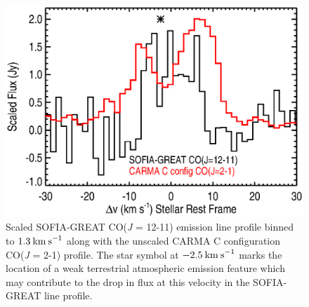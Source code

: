 \documentclass[iop]{emulateapj}
\begin{document}
\begin{figure}[hbt!]
\centering
\includegraphics[trim=60pt 0pt 0pt 0pt, scale=0.5]{f19.eps}
\caption{Scaled SOFIA-GREAT CO(\textit{J} = 12-11) emission line profile binned to $1.3\>{\rm km\>s}^{-1}$ along with the unscaled CARMA C configuration CO(\textit{J} = 2-1) profile. The star symbol at $-2.5\>{\rm km\>s}^{-1}$ marks the location of a weak terrestrial atmospheric emission feature which may contribute to the drop in flux at this velocity in the SOFIA-GREAT line profile.}
\label{fig:fig8}
\end{figure}
\end{document}

